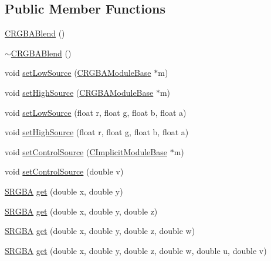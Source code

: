 \subsection*{Public Member Functions}
\begin{DoxyCompactItemize}
\item 
\hyperlink{classanl_1_1CRGBABlend_ad108c5971437662b24d368b1c89ae7e3}{CRGBABlend} ()
\item 
\hyperlink{classanl_1_1CRGBABlend_a5bdbefc0c194df5ab4e20bde19a94633}{$\sim$CRGBABlend} ()
\item 
void \hyperlink{classanl_1_1CRGBABlend_aa4f4e253ebb9839f943d90716f811eb4}{setLowSource} (\hyperlink{classanl_1_1CRGBAModuleBase}{CRGBAModuleBase} $\ast$m)
\item 
void \hyperlink{classanl_1_1CRGBABlend_ae5f388c31479fd45d0810e5c3a11be4d}{setHighSource} (\hyperlink{classanl_1_1CRGBAModuleBase}{CRGBAModuleBase} $\ast$m)
\item 
void \hyperlink{classanl_1_1CRGBABlend_afec2c97ec9f8b23afe1e4cacda23439d}{setLowSource} (float r, float g, float b, float a)
\item 
void \hyperlink{classanl_1_1CRGBABlend_ab69118e08ef7ebb1e506b9ec1a1a9f7a}{setHighSource} (float r, float g, float b, float a)
\item 
void \hyperlink{classanl_1_1CRGBABlend_a6c7486a11a1c09c53d8a7a9a3393019d}{setControlSource} (\hyperlink{classanl_1_1CImplicitModuleBase}{CImplicitModuleBase} $\ast$m)
\item 
void \hyperlink{classanl_1_1CRGBABlend_a036e45818143c06d042aafd1946c0d29}{setControlSource} (double v)
\item 
\hyperlink{structanl_1_1SRGBA}{SRGBA} \hyperlink{classanl_1_1CRGBABlend_a3cc6fa4393c7cc41da66be7e460b609f}{get} (double x, double y)
\item 
\hyperlink{structanl_1_1SRGBA}{SRGBA} \hyperlink{classanl_1_1CRGBABlend_ab7a8d72d44e559e98eb3945b90db5d52}{get} (double x, double y, double z)
\item 
\hyperlink{structanl_1_1SRGBA}{SRGBA} \hyperlink{classanl_1_1CRGBABlend_a6a44d17a9183cbff77d95203270d088a}{get} (double x, double y, double z, double w)
\item 
\hyperlink{structanl_1_1SRGBA}{SRGBA} \hyperlink{classanl_1_1CRGBABlend_a2bb566fe4302196bc650ad36048bee15}{get} (double x, double y, double z, double w, double u, double v)
\end{DoxyCompactItemize}
